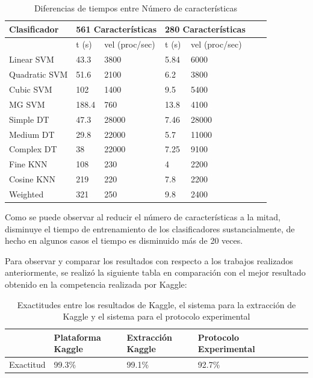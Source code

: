 \documentclass[11pt]{report}
\begin{document}
\begin{table}[H]
\begin{center}
  \begin{tabular}{|l|l|l|l|l|l|l|}
    \hline
 \textbf{Clasificador} & 
 \multicolumn{2}{c}{561 Características} &
	\multicolumn{2}{|c|}{280 Características} \\
    \hline
	& t (s) & vel (proc/sec)& t (s) & vel (proc/sec) \\
\hline
    Linear SVM & 43.3 & 3800 & 5.84 & 6000 \\
    \hline
    Quadratic SVM & 51.6 & 2100 & 6.2 & 3800 \\
    \hline
    Cubic SVM & 102 & 1400 & 9.5 & 5400\\
    \hline
     MG SVM & 188.4 & 760 & 13.8 & 4100 \\
    \hline
    Simple DT & 47.3 & 28000 & 7.46 & 28000\\
    \hline
    Medium DT & 29.8 & 22000 & 5.7 & 11000\\
    \hline
    Complex DT & 38 & 22000 & 7.25 & 9100\\
    \hline
     Fine KNN & 108 & 230 & 4 & 2200 \\
    \hline
    Cosine KNN & 219 & 220 & 7.8 & 2200 \\
    \hline
    Weighted & 321 & 250 & 9.8 & 2400 \\
    \hline
  \end{tabular}
\label{Efectos de PCA}
\caption{Diferencias de tiempos entre Número de características}
\end{center}
\end{table}

Como se puede observar al reducir el número de características a la mitad, disminuye el tiempo de entrenamiento de los clasificadores sustancialmente, de hecho en algunos casos el tiempo es disminuido más de 20 veces.

Para observar y comparar los resultados con respecto a los trabajos realizados anteriormente, se realizó la siguiente tabla en comparación con el mejor resultado obtenido en la competencia realizada por Kaggle:

\begin{table}[H]
\begin{center}
  \begin{tabular}{|l|l|l|l|l|l|l|}
    \hline
 \textbf{} & \textbf{Plataforma Kaggle} & \textbf{Extracción Kaggle}& \textbf{Protocolo Experimental}\\
    \hline
    Exactitud & 99.3\% & 99.1\% & 92.7\% \\
    \hline
  \end{tabular}
\label{Comparacion}
\caption{Exactitudes entre los resultados de Kaggle, el sistema para la extracción de Kaggle y el sistema para el protocolo experimental}
\end{center}
\end{table}
\end{document}
